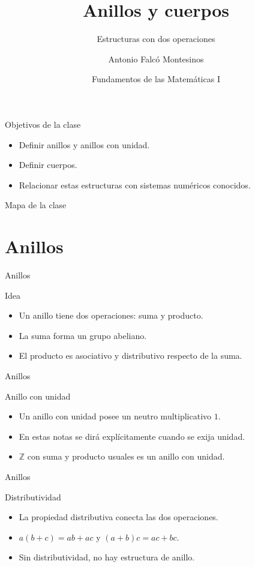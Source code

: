 \documentclass[aspectratio=169,11pt]{beamer}
\title[FdM I -- Clase 14]{Anillos y cuerpos}
\subtitle{Estructuras con dos operaciones}
\author{Antonio Falcó Montesinos}
\institute{Universidad CEU Cardenal Herrera}
\date{Fundamentos de las Matemáticas I}
\begin{document}
\begin{frame}
  \titlepage
\end{frame}

\begin{frame}{Objetivos de la clase}
\begin{itemize}
  \item Definir anillos y anillos con unidad.
  \item Definir cuerpos.
  \item Relacionar estas estructuras con sistemas numéricos conocidos.
\end{itemize}
\end{frame}

\begin{frame}{Mapa de la clase}
\tableofcontents
\end{frame}

\section{Anillos}

\begin{frame}{Anillos}
\begin{block}{Idea}
\begin{itemize}
  \item Un anillo tiene dos operaciones: suma y producto.
  \item La suma forma un grupo abeliano.
  \item El producto es asociativo y distributivo respecto de la suma.
\end{itemize}
\end{block}
\end{frame}

\begin{frame}{Anillos}
\begin{block}{Anillo con unidad}
\begin{itemize}
  \item Un anillo con unidad posee un neutro multiplicativo \(1\).
  \item En estas notas se dirá explícitamente cuando se exija unidad.
  \item \(\mathbb{Z}\) con suma y producto usuales es un anillo con unidad.
\end{itemize}
\end{block}
\end{frame}

\begin{frame}{Anillos}
\begin{block}{Distributividad}
\begin{itemize}
  \item La propiedad distributiva conecta las dos operaciones.
  \item \(a(b+c)=ab+ac\) y \((a+b)c=ac+bc\).
  \item Sin distributividad, no hay estructura de anillo.
\end{itemize}
\end{block}
\end{frame}
\end{document}
